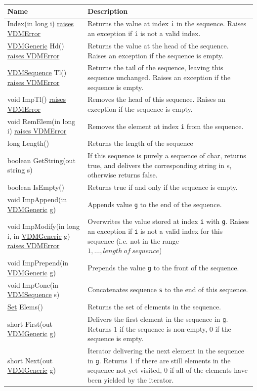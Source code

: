 \documentclass[\pformat,12pt]{article}
\newcommand{\pbs}[1]{\let\temp=\\#1\let\\=\temp}
\newenvironment{interfacetable}{%
  \begin{longtable}{|>{\pbs\raggedright\ttfamily}p{6.6cm}%
                    |>{\pbs\raggedright}p{6.6cm}|} \hline
  \textrm{\bfseries Name} &  \textbf{Description} \\ \hline
  \endhead
  }{\end{longtable}}
\newcommand{\APIError}{\hyperlink{exception.APIError}{raises APIError}}
\newcommand{\VDMError}{\hyperlink{exception.VDMError}{raises VDMError}}
\newcommand{\VDMGeneric}{\hyperlink{interface.Generic}{VDMGeneric}}
\newcommand{\VDMSequence}{\hyperlink{interface.VDMSequence}{VDMSequence}}
\newcommand{\Set}{\hyperlink{interface.VDMSet}{Set}}
\begin{document}
\begin{interfacetable}
{\VDMGeneric} Index(in long i) {\VDMError}
 & Returns the value at index \texttt{i} in the sequence. Raises an
   exception if \texttt{i} is not a valid index.
\\ \hline
{\VDMGeneric} Hd() {\VDMError}
 & Returns the value at the head of the sequence. Raises an exception
   if the sequence is empty.
\\ \hline
{\VDMSequence} Tl() {\VDMError}
 & Returns the tail of the sequence, leaving this sequence
   unchanged. Raises an exception if the sequence is empty.
\\ \hline
void ImpTl() {\VDMError}
 & Removes the head of this sequence. Raises an exception if the
   sequence is empty.
\\ \hline
void RemElem(in long i) {\VDMError}
 & Removes the element at index \texttt{i} from the sequence.
\\ \hline
long Length()
 & Returns the length of the sequence
\\ \hline
boolean GetString(out string s)
 & If this sequence is purely a sequence of char, returns true, and
   delivers the corresponding string in s, otherwise returns false.
\\ \hline
boolean IsEmpty()
 & Returns true if and only if the sequence is empty.
\\ \hline
void ImpAppend(in {\VDMGeneric} g) %
 & Appends value \texttt{g} to the end of the sequence.
\\ \hline
void ImpModify(in long i, in {\VDMGeneric} g) {\VDMError}%
 & Overwrites the value stored at index \texttt{i} with \texttt{g}.
   Raises an exception if \texttt{i} is not a valid index for this 
   sequence (i.e. not in the range $1,\ldots,length\ of\ sequence$)
\\ \hline
void ImpPrepend(in {\VDMGeneric} g) %
 & Prepends the value \texttt{g} to the front of the sequence.
\\ \hline
void ImpConc(in {\VDMSequence} s) %
 & Concatenates sequence \texttt{s} to the end of this sequence.
\\ \hline
{\Set} Elems()
 & Returns the set of elements in the sequence.
\\ \hline
short First(out {\VDMGeneric} g)
 & Delivers the first element in the sequence in \texttt{g}.
   Returns 1 if the sequence is non-empty, 0 if the sequence is empty. 
\\ \hline
short Next(out {\VDMGeneric} g)
 & Iterator delivering the next element in the sequence in \texttt{g}.
   Returns 1 if there are still elements in the sequence not yet visited, 0 if
   all of the elements have been yielded by the iterator.
\\ \hline
\end{interfacetable}
\end{document}
